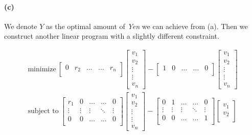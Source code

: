 \documentclass[12pt]{article}
\begin{document}
\paragraph{(c)} We denote $Y$ as the optimal amount of \emph{Yen} we can achieve from (a). Then we construct another linear program with a slightly different constraint. 

\begin{align*}
\text{minimize} ~ 
\begin{bmatrix}
0 & r_2 & \dots & \dots & r_n \\
\end{bmatrix}
\begin{bmatrix}
v_1\\
v_2\\
\vdots\\
\vdots\\
v_n
\end{bmatrix} - 
\begin{bmatrix}
1 & 0 & \dots & \dots & 0 \\
\end{bmatrix}
\begin{bmatrix}
v_1\\
v_2\\
\vdots\\
\vdots\\
v_n
\end{bmatrix}\\ 
\text{subject to} ~
\begin{bmatrix}
r_1 & 0 & \dots & \dots & 0 \\
\vdots & \vdots & \vdots & \ddots & \vdots \\
0 & 0 & \dots & \dots & 0 \\
\end{bmatrix}
\begin{bmatrix}
v_1\\
v_2\\
\vdots\\
\vdots\\
v_n
\end{bmatrix} - 
\begin{bmatrix}
0 & 1 & \dots & \dots & 0 \\
\vdots & \vdots & \vdots & \ddots & \vdots \\
0 & 0 & \dots & \dots & 1 \\
\end{bmatrix} 
\begin{bmatrix}
v_1\\
v_2\\

\end{bmatrix}
\end{align*}
\end{document}
